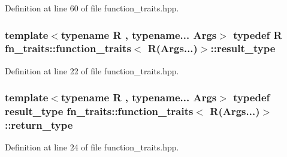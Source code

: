 Definition at line 60 of file function\+\_\+traits.\+hpp.

\subsubsection[{\texorpdfstring{result\+\_\+type}{result_type}}]{\setlength{\rightskip}{0pt plus 5cm}template$<$typename R , typename... Args$>$ typedef R {\bf fn\+\_\+traits\+::function\+\_\+traits}$<$ R(Args...)$>$\+::{\bf result\+\_\+type}\hspace{0.3cm}{\ttfamily [inherited]}}\hypertarget{structfn__traits_1_1function__traits_3_01_r_07_args_8_8_8_08_4_a1b509243ed1b4707465625de10e6c6bb}{}\label{structfn__traits_1_1function__traits_3_01_r_07_args_8_8_8_08_4_a1b509243ed1b4707465625de10e6c6bb}


Definition at line 22 of file function\+\_\+traits.\+hpp.

\subsubsection[{\texorpdfstring{return\+\_\+type}{return_type}}]{\setlength{\rightskip}{0pt plus 5cm}template$<$typename R , typename... Args$>$ typedef {\bf result\+\_\+type} {\bf fn\+\_\+traits\+::function\+\_\+traits}$<$ R(Args...)$>$\+::{\bf return\+\_\+type}\hspace{0.3cm}{\ttfamily [inherited]}}\hypertarget{structfn__traits_1_1function__traits_3_01_r_07_args_8_8_8_08_4_adf6a35a9b703dfb4778e59f132e00a9b}{}\label{structfn__traits_1_1function__traits_3_01_r_07_args_8_8_8_08_4_adf6a35a9b703dfb4778e59f132e00a9b}


Definition at line 24 of file function\+\_\+traits.\+hpp.

